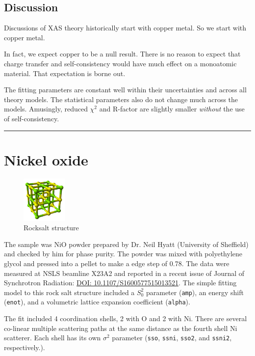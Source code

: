 \documentclass[11pt]{article}
\begin{document}
\subsection{Discussion}
\label{sec:orgheadline6}

Discussions of XAS theory historically start with copper metal.  So we
start with copper metal.

In fact, we expect copper to be a null result. There is no reason to
expect that charge transfer and self-consistency would have much effect
on a monoatomic material. That expectation is borne out.

The fitting parameters are constant well within their uncertainties
and across all theory models. The statistical parameters also do not
change much across the models. Amusingly, reduced $\chi^2$ and
R-factor are slightly smaller \emph{without} the use of
self-consistency.

\rule{\linewidth}{0.5pt}

\section{Nickel oxide}
\label{sec:orgheadline13}

\begin{figure}
  \begin{center}
    \includegraphics[width=0.2\textwidth]{NiO/NiO.png}
  \end{center}
  \caption{Rocksalt structure}
\end{figure}


The sample was NiO powder prepared by Dr. Neil Hyatt (University of
Sheffield) and checked by him for phase purity. The powder was mixed
with polyethylene glycol and pressed into a pellet to make a edge step
of 0.78. The data were measured at NSLS beamline X23A2 and reported in
a recent issue of Journal of Synchrotron Radiation:
\href{http://dx.doi.org/10.1107/S1600577515013521}{DOI:
  10.1107/S1600577515013521}. The simple fitting model to this rock
salt structure included a $S_0^2$ parameter (\texttt{amp}), an energy
shift (\texttt{enot}), and a volumetric lattice expansion coefficient
(\texttt{alpha}).

The fit included 4 coordination shells, 2 with O and 2 with Ni. There
are several co-linear multiple scattering paths at the same distance
as the fourth shell Ni scatterer. Each shell has its own $\sigma^2$
parameter (\texttt{sso}, \texttt{ssni}, \texttt{sso2}, and
\texttt{ssni2}, respectively.).
\end{document}

